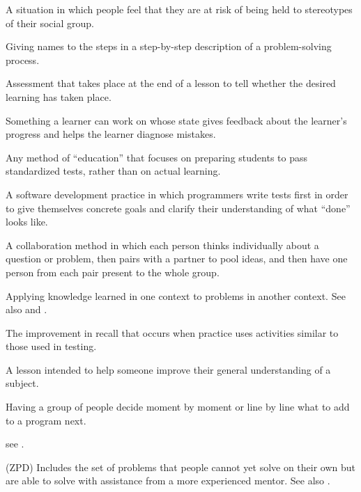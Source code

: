 \begin{description}
 A situation in which people feel
that they are at risk of being held to stereotypes of their social group.

 Giving names to the steps in a
step-by-step description of a problem-solving process.

 Assessment that takes
place at the end of a lesson to tell whether the desired learning has taken
place.

 Something a learner can work on
whose state gives feedback about the learner's progress and helps the learner
diagnose mistakes.

 Any method of ``education''
that focuses on preparing students to pass standardized tests, rather than on
actual learning.

 A software
development practice in which programmers write tests first in order to give
themselves concrete goals and clarify their understanding of what ``done'' looks
like.

 A collaboration method in which
each person thinks individually about a question or problem, then pairs with a
partner to pool ideas, and then have one person from each pair present to the
whole group.

 Applying knowledge learned
in one context to problems in another context.  See also
 and .

 The
improvement in recall that occurs when practice uses activities similar to those
used in testing.

 A lesson intended to help someone improve their
general understanding of a subject.

 Having a group of people decide moment
by moment or line by line what to add to a program next.

 see .

 (ZPD) Includes the set of problems that
people cannot yet solve on their own but are able to solve with assistance from
a more experienced mentor.  See also .

\end{description}
